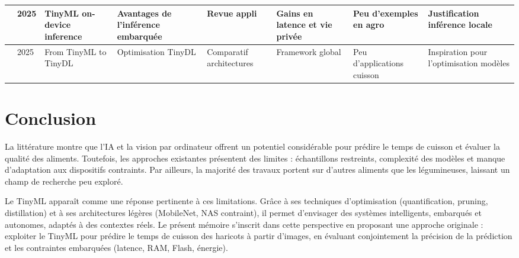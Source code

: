 \begin{table}[H]
\begin{tabularx}{\textwidth}{|p{0.5cm}|p{0.7cm}|p{2.0cm}|X|X|X|X|X|}
        \hline
        \cite{heydari2025sensors}    & 2025           & TinyML on-device inference   & Avantages de l’inférence embarquée & Revue appli              & Gains en latence et vie privée & Peu d’exemples en agro          & Justification inférence locale \\
        \hline
        \cite{sensors2025_tinydl}    & 2025           & From TinyML to TinyDL        & Optimisation TinyDL              & Comparatif architectures    & Framework global             & Peu d’applications cuisson       & Inspiration pour l’optimisation modèles \\
        \hline
    \end{tabularx}
\end{table}

\section{Conclusion}
La littérature montre que l’IA et la vision par ordinateur offrent un potentiel considérable pour prédire le temps de cuisson et évaluer la qualité des aliments. Toutefois, les approches existantes présentent des limites : échantillons restreints, complexité des modèles et manque d’adaptation aux dispositifs contraints. Par ailleurs, la majorité des travaux portent sur d’autres aliments que les légumineuses, laissant un champ de recherche peu exploré.

Le TinyML apparaît comme une réponse pertinente à ces limitations. Grâce à ses techniques d’optimisation (quantification, pruning, distillation) et à ses architectures légères (MobileNet, NAS contraint), il permet d’envisager des systèmes intelligents, embarqués et autonomes, adaptés à des contextes réels. Le présent mémoire s’inscrit dans cette perspective en proposant une approche originale : exploiter le TinyML pour prédire le temps de cuisson des haricots à partir d’images, en évaluant conjointement la précision de la prédiction et les contraintes embarquées (latence, RAM, Flash, énergie).
